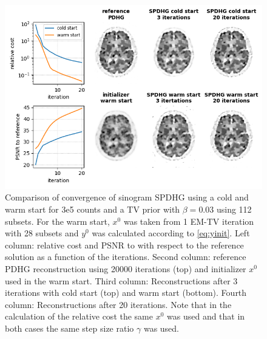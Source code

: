 \begin{figure}
  \centering
    \includegraphics[width=1.0\columnwidth]{figs/SPDHG_cold_vs_warm_start.png}
  \caption{Comparison of convergence of sinogram SPDHG using a cold and warm start
           for 3e5 counts and a TV prior with $\beta = 0.03$ using 112 subsets.
           For the warm start, $x^0$ was taken from 1 EM-TV iteration with 28 subsets
           and $y^0$ was calculated according to \eqref{eq:yinit}.
           Left column: relative cost and PSNR to with respect to the reference solution as
           a function of the iterations.
           Second column: reference PDHG reconstruction using 20000 iterations (top) and
           initializer $x^0$ used in the warm start.
           Third column: Reconstructions after 3 iterations with cold start (top) and warm
           start (bottom).
           Fourth column: Reconstructions after 20 iterations.
           Note that in the calculation of the relative cost the same $x^0$ was used
           and that in both cases the same step size ratio $\gamma$ was used.
          }
  \label{fig:warm_start}
\end{figure}

